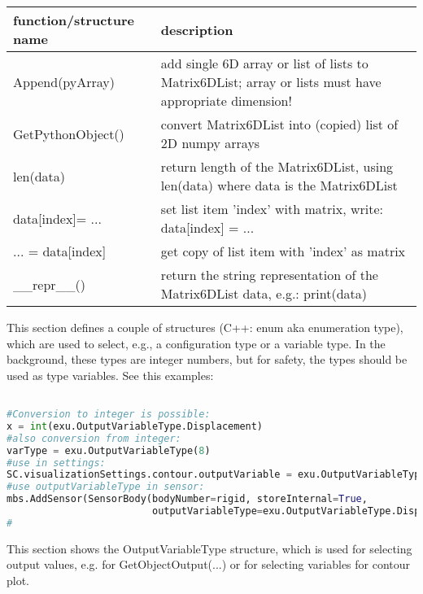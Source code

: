 \begin{center}
\footnotesize
\begin{longtable}{| p{8cm} | p{8cm} |} 
\hline
{\bf function/structure name} & {\bf description}\\ \hline
  Append(pyArray) & add single 6D array or list of lists to Matrix6DList; array or lists must have appropriate dimension!\\ \hline 
  GetPythonObject() & convert Matrix6DList into (copied) list of 2D numpy arrays\\ \hline 
  len(data) & return length of the Matrix6DList, using len(data) where data is the Matrix6DList\\ \hline 
  data[index]= ... & set list item 'index' with matrix, write: data[index] = ...\\ \hline 
  ... = data[index] & get copy of list item with 'index' as matrix\\ \hline 
  \_\_repr\_\_() & return the string representation of the Matrix6DList data, e.g.: print(data)\\ \hline 
\end{longtable}
\end{center}

\label{sec:cinterface:typedef}
This section defines a couple of structures (C++: enum aka enumeration type), which are used to select, e.g., a configuration type or a variable type. In the background, these types are integer numbers, but for safety, the types should be used as type variables. See this examples:

\pythonstyle
\begin{lstlisting}[language=Python, firstnumber=1]

#Conversion to integer is possible: 
x = int(exu.OutputVariableType.Displacement)
#also conversion from integer: 
varType = exu.OutputVariableType(8)
#use in settings:
SC.visualizationSettings.contour.outputVariable = exu.OutputVariableType.StressLocal
#use outputVariableType in sensor:
mbs.AddSensor(SensorBody(bodyNumber=rigid, storeInternal=True,
                         outputVariableType=exu.OutputVariableType.Displacement))
#
\end{lstlisting}


\label{sec:OutputVariableType}
This section shows the OutputVariableType structure, which is used for selecting output values, e.g. for GetObjectOutput(...) or for selecting variables for contour plot.

